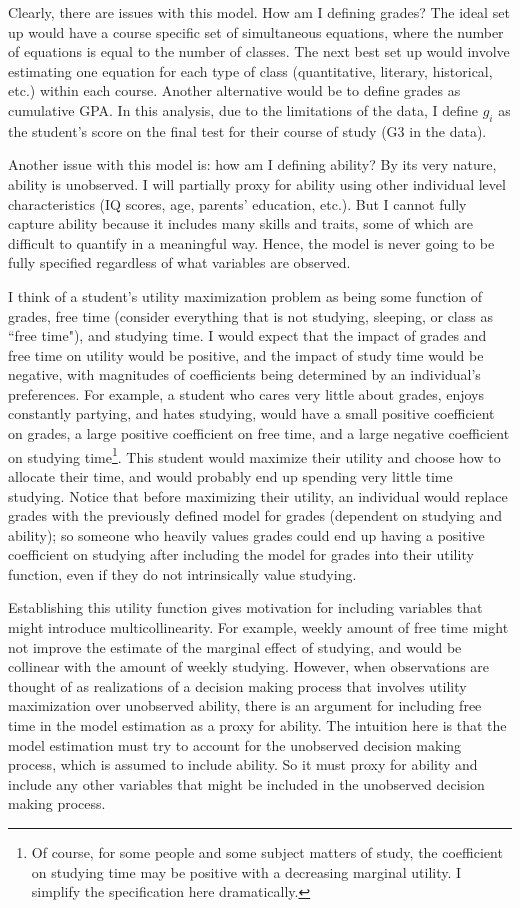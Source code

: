 \documentclass[12pt]{article}
\begin{document}
Clearly, there are issues with this model. How am I defining grades? The ideal set up would have a course specific set of simultaneous equations, where the number of equations is equal to the number of classes. The next best set up would involve estimating one equation for each type of class (quantitative, literary, historical, etc.) within each course. Another alternative would be to define grades as cumulative GPA. In this analysis, due to the limitations of the data, I define $g_i$ as the student's score on the final test for their course of study (G3 in the data).

Another issue with this model is: how am I defining ability? By its very nature, ability is unobserved. I will partially proxy for ability using other individual level characteristics (IQ scores, age, parents' education, etc.). But I cannot fully capture ability because it includes many skills and traits, some of which are difficult to quantify in a meaningful way. Hence, the model is never going to be fully specified regardless of what variables are observed.

I think of a student's utility maximization problem as being some function of grades, free time (consider everything that is not studying, sleeping, or class as ``free time"), and studying time. I would expect that the impact of grades and free time on utility would be positive, and the impact of study time would be negative, with magnitudes of coefficients being determined by an individual's preferences. For example, a student who cares very little about grades, enjoys constantly partying, and hates studying, would have a small positive coefficient on grades, a large positive coefficient on free time, and a large negative coefficient on studying time\footnote{Of course, for some people and some subject matters of study, the coefficient on studying time may be positive with a decreasing marginal utility. I simplify the specification here dramatically.}. This student would maximize their utility and choose how to allocate their time, and would probably end up spending very little time studying. Notice that before maximizing their utility, an individual would replace grades with the previously defined model for grades (dependent on studying and ability); so someone who heavily values grades could end up having a positive coefficient on studying after including the model for grades into their utility function, even if they do not intrinsically value studying.

Establishing this utility function gives motivation for including variables that might introduce multicollinearity. For example, weekly amount of free time might not improve the estimate of the marginal effect of studying, and would be collinear with the amount of weekly studying. However, when observations are thought of as realizations of a decision making process that involves utility maximization over unobserved ability, there is an argument for including free time in the model estimation as a proxy for ability. The intuition here is that the model estimation must try to account for the unobserved decision making process, which is assumed to include ability. So it must proxy for ability and include any other variables that might be included in the unobserved decision making process.
\end{document}
